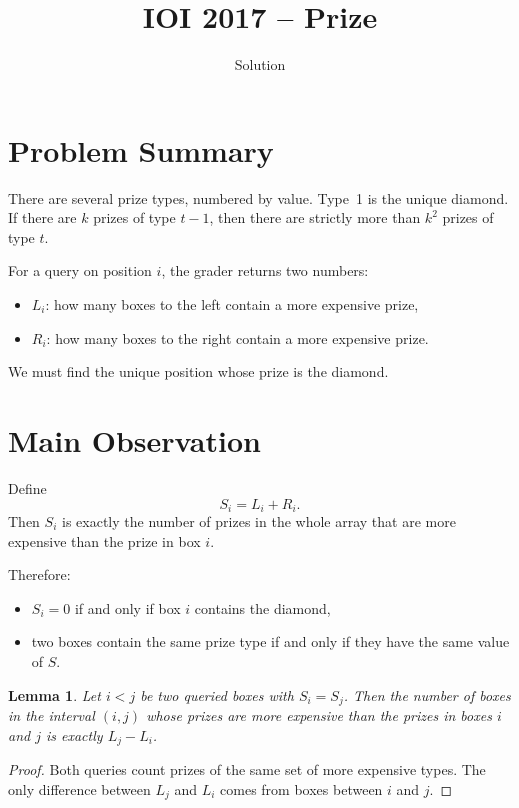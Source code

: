 \documentclass[11pt,a4paper]{article}
\title{IOI 2017 -- Prize}
\author{Solution}
\date{}
\newtheorem{lemma}{Lemma}
\begin{document}
\maketitle

\section{Problem Summary}

There are several prize types, numbered by value. Type~1 is the unique
diamond. If there are $k$ prizes of type $t-1$, then there are strictly more
than $k^2$ prizes of type $t$.

For a query on position $i$, the grader returns two numbers:
\begin{itemize}
  \item $L_i$: how many boxes to the left contain a more expensive prize,
  \item $R_i$: how many boxes to the right contain a more expensive prize.
\end{itemize}

We must find the unique position whose prize is the diamond.

\section{Main Observation}

Define
\[
  S_i = L_i + R_i.
\]
Then $S_i$ is exactly the number of prizes in the whole array that are more
expensive than the prize in box $i$.

Therefore:
\begin{itemize}
  \item $S_i = 0$ if and only if box $i$ contains the diamond,
  \item two boxes contain the same prize type if and only if they have the same
        value of $S$.
\end{itemize}

\begin{lemma}
Let $i < j$ be two queried boxes with $S_i = S_j$. Then the number of boxes in
the interval $(i, j)$ whose prizes are more expensive than the prizes in boxes
$i$ and $j$ is exactly $L_j - L_i$.
\end{lemma}

\begin{proof}
Both queries count prizes of the same set of more expensive types. The only
difference between $L_j$ and $L_i$ comes from boxes between $i$ and $j$.
\end{proof}
\end{document}

